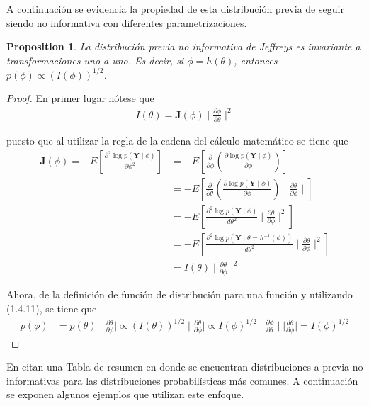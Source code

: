 \documentclass[
  spanish,
  letter]{book}
\newtheorem{proposition}{Proposition}[chapter]
\theoremstyle{definition}
\theoremstyle{definition}
\theoremstyle{definition}
\theoremstyle{remark}
\begin{document}
A continuación se evidencia la propiedad de esta distribución previa de seguir siendo no informativa con diferentes parametrizaciones.
\begin{proposition}
\protect\hypertarget{prp:unnamed-chunk-33}{}{\label{prp:unnamed-chunk-33} }La distribución \emph{previa} no informativa de Jeffreys es invariante a transformaciones uno a uno. Es decir, si \(\phi=h(\theta)\), entonces \(p(\phi)\propto(I(\phi))^{1/2}\).
\end{proposition}

\begin{proof}
\iffalse{} {Proof. } \fi{}En primer lugar nótese que
\begin{align*}
I(\theta)=\mathbf{J}(\phi) \mid \frac{\partial\phi}{\partial\theta} \mid ^{2}
\end{align*}

puesto que al utilizar la regla de la cadena del cálculo matemático se tiene que
\begin{align*}
\mathbf{J}(\phi)= - E\left[\frac{\partial^2 \log p(\mathbf{Y} \mid \phi)}{\partial\phi^2}\right]
&= - E\left[\frac{\partial}{\partial\phi}\left(\frac{\partial \log p(\mathbf{Y} \mid \phi)}{\partial\phi}\right)\right]\\
&= - E\left[\frac{\partial}{\partial\theta}\left(\frac{\partial \log p(\mathbf{Y} \mid \phi)}{\partial\phi}\right) \mid \frac{\partial\theta}{\partial\phi} \mid \right]\\
&= - E\left[\frac{\partial^2 \log p(\mathbf{Y} \mid \phi)}{d\theta^2} \mid \frac{\partial\theta}{\partial\phi} \mid ^{2}\right]\\
&= - E\left[\frac{\partial^2 \log p(\mathbf{Y} \mid \theta =h^{-1}(\phi))}{d\theta^2} \mid \frac{\partial\theta}{\partial\phi} \mid ^{2}\right]\\
&= I(\theta) \mid \frac{\partial\theta}{\partial\phi} \mid ^{2}
\end{align*}

Ahora, de la definición de función de distribución para una función y utilizando (1.4.11), se tiene que
\begin{align*}
p(\phi)&=p(\theta) \mid \frac{\partial\theta}{\partial\phi} \mid
\propto (I(\theta))^{1/2} \mid \frac{\partial\theta}{\partial\phi} \mid
\propto I(\phi)^{1/2} \mid \frac{\partial\phi}{\partial\theta} \mid  \mid \frac{d\theta}{\partial\phi} \mid =I(\phi)^{1/2}
\end{align*}
\end{proof}

En  citan una Tabla de resumen en donde se encuentran distribuciones a previa no informativas para las distribuciones probabilísticas más comunes. A continuación se exponen algunos ejemplos que utilizan este enfoque.
\end{document}
